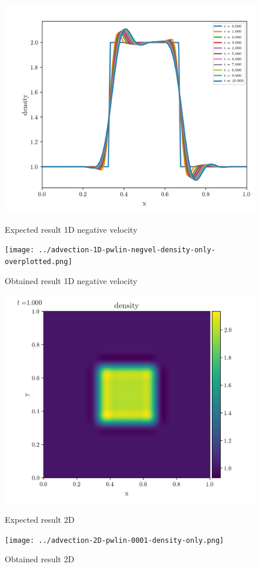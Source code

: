 \begin{figure}[htbp]
    \centering
	\includegraphics[width=.7\textwidth]{./figures/advection-1D-pwlin-negvel-density-only-overplotted.png}%
	\caption{Expected result 1D negative velocity}
	\texttt{[image: ../advection-1D-pwlin-negvel-density-only-overplotted.png]}%
	\caption{Obtained result 1D negative velocity}
\end{figure}

\begin{figure}[htbp]
    \centering
	\includegraphics[width=.7\textwidth]{./figures/advection-2D-pwlin-0001-density-only.png}%
	\caption{Expected result 2D}
	\texttt{[image: ../advection-2D-pwlin-0001-density-only.png]}%
	\caption{Obtained result 2D}
\end{figure}

